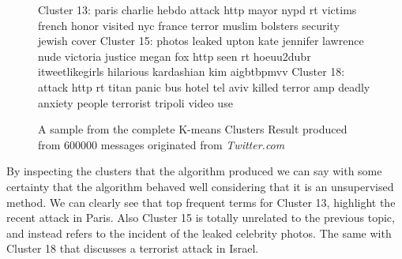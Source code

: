 \documentclass[12pt]{article}
\begin{document}
\begin{figure}[h!]
\begin{footnotesize}
\begin{spverbatim}
Cluster 13:  paris  charlie  hebdo  attack  http  mayor  nypd  
rt  victims  french  honor  visited  nyc  france  terror  muslim 
 bolsters  security  jewish  cover
Cluster 15:  photos  leaked  upton  kate  jennifer  lawrence 
 nude  victoria  justice  megan  fox  http  seen  rt  hoeuu2dubr  
itweetlikegirls  hilarious  kardashian  kim  aigbtbpmvv
Cluster 18: attack http rt titan panic bus hotel tel aviv killed 
terror amp deadly anxiety people terrorist tripoli video use
\end{spverbatim}
\end{footnotesize}
\captionsetup{font=small}
\caption{A sample from the complete K-means Clusters Result produced from  600000 messages originated from \textit{Twitter.com} }
\label{fig:clusters}
\end{figure}
\hfill \break
By inspecting the clusters that the algorithm produced we can say with some certainty that the algorithm behaved well considering that it is an unsupervised method.
We can clearly see that top frequent terms for Cluster 13, highlight the recent attack in Paris\cite{paris-attack}. Also Cluster 15 is totally unrelated to the previous topic, and instead refers to the incident of the leaked celebrity photos\cite{fappening}. The same with Cluster 18 that discusses a terrorist attack in Israel\cite{tel-aviv}.  
\end{document}
